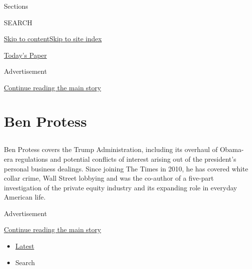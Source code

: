 Sections

SEARCH

\protect\hyperlink{site-content}{Skip to
content}\protect\hyperlink{site-index}{Skip to site index}

\href{https://myaccount.nytimes.com/auth/login?response_type=cookie\&client_id=vi}{}

\href{https://www.nytimes.com/section/todayspaper}{Today's Paper}

Advertisement

\protect\hyperlink{after-top}{Continue reading the main story}

\hypertarget{ben-protess}{%
\section{Ben Protess}\label{ben-protess}}

\subsection{}

Ben Protess covers the Trump Administration, including its overhaul of
Obama-era regulations and potential conflicts of interest arising out of
the president's personal business dealings. Since joining The Times in
2010, he has covered white collar crime, Wall Street lobbying and was
the co-author of a five-part investigation of the private equity
industry and its expanding role in everyday American life.

Advertisement

\protect\hyperlink{after-mid1}{Continue reading the main story}

\begin{itemize}
\tightlist
\item
  \protect\hyperlink{stream-panel}{Latest}
\item
  Search
\end{itemize}

